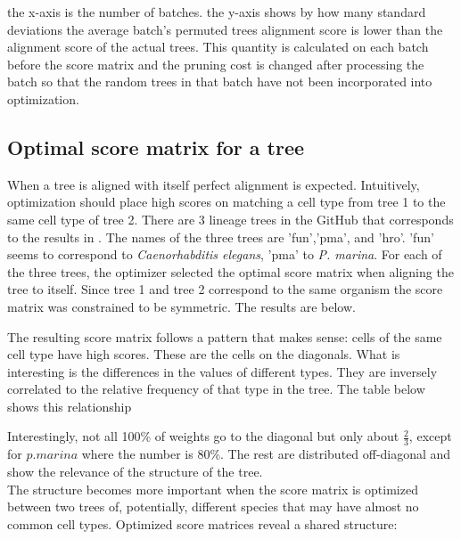 \documentclass[12pt]{article}
\begin{document}
the x-axis is the number of batches. the y-axis shows by how many standard deviations the average batch's permuted trees alignment score is lower than the alignment score of the actual trees. This quantity is calculated on each batch before the score matrix and the pruning cost is changed after processing the batch so that the random trees in that batch have not been incorporated into optimization.\\
\subsection{Optimal score matrix for a tree}
When a tree is aligned with itself perfect alignment is expected. Intuitively, optimization should place high scores on matching a cell type from tree 1 to the same cell type of tree 2. There are 3 lineage trees in the GitHub that corresponds to the results in \cite{CLT}. The names of the three trees are 'fun','pma', and 'hro'. 'fun' seems to correspond to {\it Caenorhabditis elegans}, 'pma' to {\it P. marina}. For each of the three trees, the optimizer selected the optimal score matrix when aligning the tree to itself. Since tree 1 and tree 2 correspond to the same organism the score matrix was constrained to be symmetric. The results are below.





The resulting score matrix follows a pattern that makes sense: cells of the same cell type have high scores. These are the cells on the diagonals. What is interesting is the differences in the values of different types. They are inversely correlated to the relative frequency of that type in the tree. The table below shows this relationship


Interestingly, not all 100\% of weights go to the diagonal but only about \(\frac 2 3\), except for \(p.marina\) where the number is 80\%. The rest are distributed off-diagonal and show the relevance of the structure of the tree. \\
The structure becomes more important when the score matrix is optimized between two trees of, potentially, different species that may have almost no common cell types. Optimized score matrices reveal a shared structure:




\end{document}

